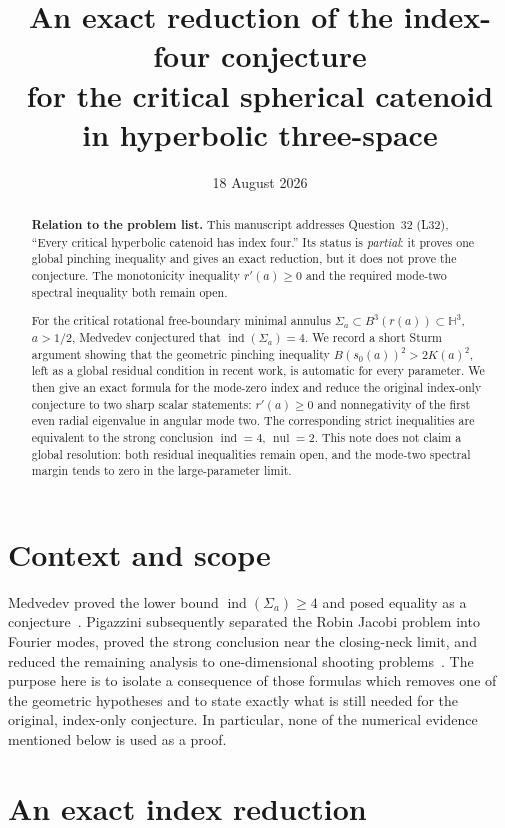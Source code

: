 \documentclass[11pt]{article}
\title{An exact reduction of the index-four conjecture\\
for the critical spherical catenoid in hyperbolic three-space}
\author{}
\date{18 August 2026}
\newcommand{\ind}{\operatorname{ind}}
\newcommand{\nul}{\operatorname{nul}}
\begin{document}
\maketitle

\begin{abstract}
\textbf{Relation to the problem list.}
This manuscript addresses Question~32 (L32), ``Every critical hyperbolic
catenoid has index four.''  Its status is \emph{partial}: it proves one global
pinching inequality and gives an exact reduction, but it does not prove the
conjecture.  The monotonicity inequality $r'(a)\ge0$ and the required
mode-two spectral inequality both remain open.

For the critical rotational free-boundary minimal annulus
$\Sigma_a\subset B^3(r(a))\subset\mathbb H^3$, $a>1/2$, Medvedev
conjectured that $\ind(\Sigma_a)=4$.  We record a short Sturm argument
showing that the geometric pinching inequality
$B(s_0(a))^2>2K(a)^2$, left as a global residual condition in recent
work, is automatic for every parameter.  We then give an exact formula
for the mode-zero index and reduce the original index-only conjecture
to two sharp scalar statements: $r'(a)\geq0$ and nonnegativity of the
first even radial eigenvalue in angular mode two.  The corresponding
strict inequalities are equivalent to the strong conclusion
$\ind=4$, $\nul=2$.  This note does not claim a global resolution:
both residual inequalities remain open, and the mode-two spectral
margin tends to zero in the large-parameter limit.
\end{abstract}

\section{Context and scope}

Medvedev proved the lower bound $\ind(\Sigma_a)\geq4$ and posed equality
as a conjecture~\cite{Medvedev}.  Pigazzini subsequently separated the
Robin Jacobi problem into Fourier modes, proved the strong conclusion
near the closing-neck limit, and reduced the remaining analysis to
one-dimensional shooting problems~\cite{PigazziniLocal,PigazziniMode}.
The purpose here is to isolate a consequence of those formulas which
removes one of the geometric hypotheses and to state exactly what is
still needed for the original, index-only conjecture.  In particular,
none of the numerical evidence mentioned below is used as a proof.

\section{An exact index reduction}
\end{document}
